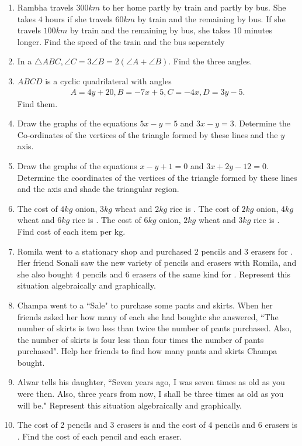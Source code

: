 \begin{enumerate}[label=\thesubsection.\arabic*, ref=\thesubsection.\theenumi]
\item Rambha travels $300 km$ to her home partly by train and partly by bus. She takes $4$ hours if she travels $60km$ by train and the remaining by bus. If she travels $100km$ by train and the remaining by bus,  she takes $10$ minutes longer. Find the speed of the train and the bus seperately
\item In a $\triangle ABC,  \angle C=3 \angle B=2(\angle A+\angle B)$.  Find the three angles. 
\item $ABCD$ is a cyclic quadrilateral 
	with angles
\begin{align}
	A = 4y+20,  B = -7x+5,  C = -4x,  D = 3y-5. 
\end{align}
Find them.  
\item Draw the graphs of the equations $5x-y=5$ and $3x-y=3$.  Determine the Co-ordinates of the vertices of the triangle formed by these lines and the $y$ axis. 
\item Draw the graphs of the equations $x-y+1=0$ and $3x+2y-12=0$.  Determine the coordinates of the vertices of the triangle formed by these lines and the axis and shade the triangular region. 
\item The cost of $4 kg$ onion, $3 kg$ wheat and $2 kg$ rice is . The cost of $2 kg$ onion, $4 kg$ wheat and $6 kg$ rice is . The cost of $6 kg$ onion, $2 kg$ wheat and $3 kg$ rice is . Find cost of each item per kg. 
\item Romila went to a stationary shop and purchased $2$ pencils and $3$ erasers for . Her friend Sonali saw the new variety of pencils and erasers with Romila, and she also bought $4$ pencils and $6$ erasers of the same kind for . Represent this situation algebraically and graphically.
\item Champa went to a ``Sale" to purchase some pants and skirts. When her friends asked her how many of each she had boughtc she answered, ``The number of skirts is two less than twice the number of pants purchased. Also, the number of skirts is four less than four times the number of pants purchased". Help her friends to find how many pants and skirts Champa bought.
\item 
Alwar tells his daughter, ``Seven years ago, I was seven times as old as you were then. Also, three years from now, I shall be three times as old as you will be."   Represent this situation algebraically and graphically.
\item The cost of 2 pencils and 3 erasers is  and the cost of 4 pencils and 6 erasers is . Find the cost of each pencil and each eraser.

\end{enumerate}
